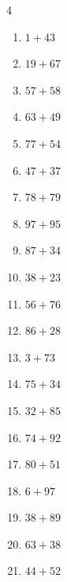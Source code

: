 \begin{multicols}{4}
\begin{enumerate}
  \item $1+43$
        \phantom{$=44$}

  \item $19+67$
        \phantom{$=86$}

  \item $57+58$
        \phantom{$=115$}

  \item $63+49$
        \phantom{$=112$}

  \item $77+54$
        \phantom{$=131$}

  \item $47+37$
        \phantom{$=84$}

  \item $78+79$
        \phantom{$=157$}

  \item $97+95$
        \phantom{$=192$}

  \item $87+34$
        \phantom{$=121$}

  \item $38+23$
        \phantom{$=61$}

  \item $56+76$
        \phantom{$=132$}

  \item $86+28$
        \phantom{$=114$}

  \item $3+73$
        \phantom{$=76$}

  \item $75+34$
        \phantom{$=109$}

  \item $32+85$
        \phantom{$=117$}

  \item $74+92$
        \phantom{$=166$}

  \item $80+51$
        \phantom{$=131$}

\columnbreak %

  \item $6+97$
        \phantom{$=103$}

  \item $38+89$
        \phantom{$=127$}

  \item $63+38$
        \phantom{$=101$}

  \item $44+52$
        \phantom{$=96$}


\end{enumerate}
\end{multicols}
